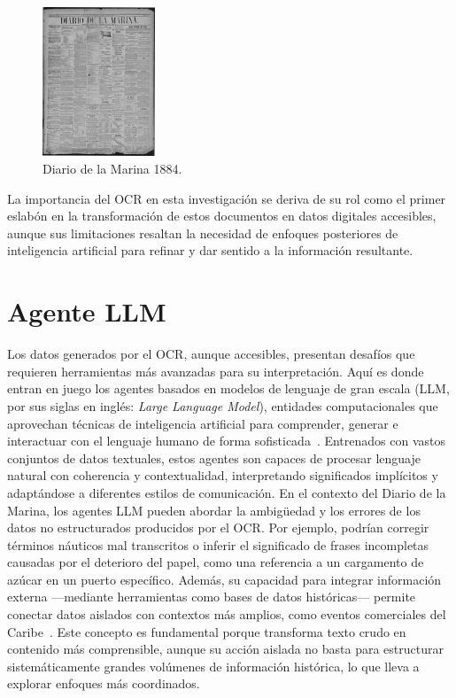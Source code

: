 \begin{figure}[h]
	\centering
	\includegraphics[width=0.3\textwidth]{images/diario}
	\caption{Diario de la Marina 1884.}
	\label{fig:Diario de la Marina 1884}
\end{figure}

La importancia del OCR en esta investigación se deriva de su rol como el primer eslabón en la transformación de estos documentos en datos digitales accesibles, aunque sus limitaciones resaltan la necesidad de enfoques posteriores de inteligencia artificial para refinar y dar sentido a la información resultante.

\section{Agente LLM}\label{seq_3}

Los datos generados por el OCR, aunque accesibles, presentan desafíos que requieren herramientas más avanzadas para su interpretación. Aquí es donde entran en juego los agentes basados en modelos de lenguaje de gran escala (LLM, por sus siglas en inglés: \textit{Large Language Model}), entidades computacionales que aprovechan técnicas de inteligencia artificial para comprender, generar e interactuar con el lenguaje humano de forma sofisticada~\cite{guo2024largelanguage}. Entrenados con vastos conjuntos de datos textuales, estos agentes son capaces de procesar lenguaje natural con coherencia y contextualidad, interpretando significados implícitos y adaptándose a diferentes estilos de comunicación.
En el contexto del Diario de la Marina, los agentes LLM pueden abordar la ambigüedad y los errores de los datos no estructurados producidos por el OCR. Por ejemplo, podrían corregir términos náuticos mal transcritos o inferir el significado de frases incompletas causadas por el deterioro del papel, como una referencia a un cargamento de azúcar en un puerto específico. Además, su capacidad para integrar información externa —mediante herramientas como bases de datos históricas— permite conectar datos aislados con contextos más amplios, como eventos comerciales del Caribe~\cite{guo2024largelanguage}. Este concepto es fundamental porque transforma texto crudo en contenido más comprensible, aunque su acción aislada no basta para estructurar sistemáticamente grandes volúmenes de información histórica, lo que lleva a explorar enfoques más coordinados.



